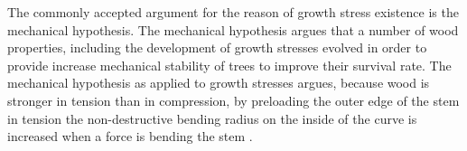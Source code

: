 The commonly accepted argument for the reason of growth stress existence is
the mechanical hypothesis. The mechanical hypothesis argues that a number of wood
properties, including the development of growth stresses evolved in order to
provide increase mechanical stability of trees to improve their
survival rate. The mechanical hypothesis as applied to growth stresses argues,
because wood is stronger in tension than in compression, by preloading the outer
edge of the stem in tension the non-destructive bending radius on
the inside of the curve is increased when a force is bending the stem \cite{barnett2003wood}.